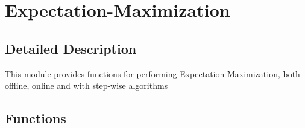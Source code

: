 \hypertarget{group___expectation_maximization_module}{}\section{Expectation-\/\+Maximization}
\label{group___expectation_maximization_module}


\subsection{Detailed Description}
This module provides functions for performing Expectation-\/\+Maximization, both offline, online and with step-\/wise algorithms \subsection*{Functions}
